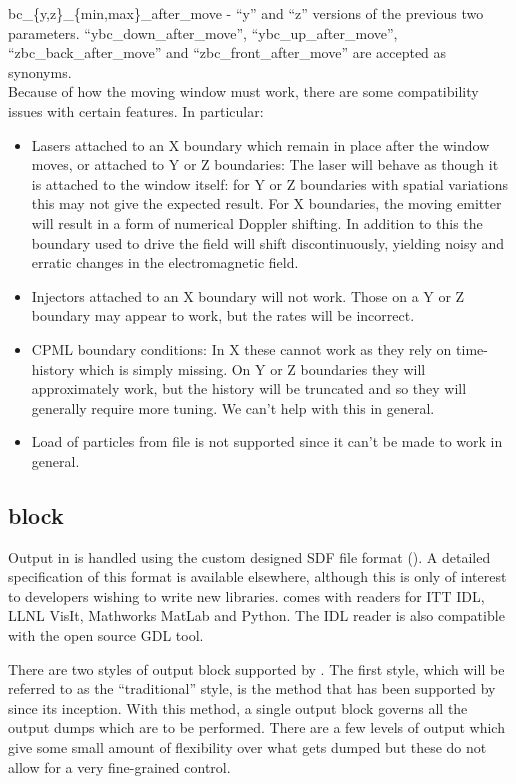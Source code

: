 {\emphtext bc\_\{y,z\}\_\{min,max\}\_after\_move} - ``y'' and ``z'' versions of
  the previous two parameters.
  ``ybc\_down\_after\_move'', ``ybc\_up\_after\_move'',
  ``zbc\_back\_after\_move'' and ``zbc\_front\_after\_move'' are accepted as
  synonyms.\\

Because of how the moving window must work, there are some compatibility issues
with certain features. In particular:
\begin{itemize}
\item Lasers attached to an X boundary which remain in place after the window
moves, or attached to Y or Z boundaries:
\subitem The laser will behave as though it is attached to the window itself:
for Y or Z boundaries with spatial variations this may not give the expected
result.
\subitem For X boundaries, the moving emitter will result in a form of
numerical Doppler shifting. In addition to this the boundary used to drive
the field will shift discontinuously, yielding noisy and erratic changes
in the electromagnetic field.
\item Injectors attached to an X boundary will not work. Those on a Y
or Z boundary may appear to work, but the rates will be incorrect.
\item CPML boundary conditions:
\subitem In X these cannot work as they rely on time-history which is
simply missing.
\subitem On Y or Z boundaries they will approximately work, but the history
will be truncated and so they will generally require more tuning.
We can't help with this in general.
\item Load of particles from file is not supported since it can't be made to
work in general.
\end{itemize}

\subsection{\texorpdfstring
  { block}
  {           {output} block}}
\label{sec:output_block}
Output in {\EPOCH} is handled using the custom designed SDF file format
(). A detailed specification of this
format is available elsewhere, although this is only of interest to
developers wishing to write new libraries.
{\EPOCH} comes with readers for ITT IDL, LLNL VisIt, Mathworks MatLab and
Python.
The IDL reader is also compatible with the open source GDL tool.

There are two styles of output block supported by {\EPOCH}. The first
style, which will be referred to as the ``traditional'' style, is the
method that has been supported by {\EPOCH} since its inception. With this
method, a single output block governs all the output dumps which are to be
performed. There are a few levels of output which give some small amount of
flexibility over what gets dumped but these do not allow for a very
fine-grained control.

